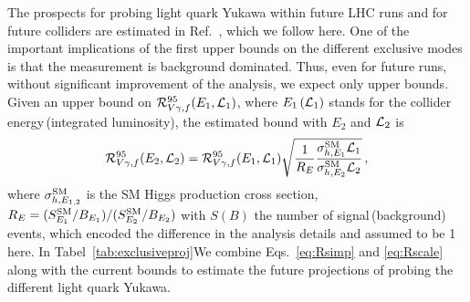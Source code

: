 \documentclass[../report.tex]{subfiles}
\begin{document}
The prospects for probing light quark Yukawa within future LHC runs and for future colliders are estimated in Ref.~\cite{Perez:2015lra}, which we follow here. 
One of the important implications of the first upper bounds on the different exclusive modes is that the measurement is background dominated. Thus, even for future runs, without significant improvement of the analysis, we expect only upper bounds.  
Given an upper bound on $\mathcal{R}^{95}_{V\gamma,f}(E_1,\mathcal{L}_1)$, where $E_1\,(\mathcal{L}_1)$ stands for the collider energy\,(integrated luminosity), the estimated bound with $E_2$ and $\mathcal{L}_2$ is
%
\begin{align}
	\label{eq:Rscale}
	\mathcal{R}^{95}_{V\gamma,f}(E_2,\mathcal{L}_2)
=	\mathcal{R}^{95}_{V\gamma,f}(E_1,\mathcal{L}_1) \sqrt{ \frac{1}{R_E} \frac{\sigma^{\rm SM}_{h,E_1} \mathcal{L}_1  }{\sigma^{\rm SM}_{h,E_2} \mathcal{L}_2} } \, ,
\end{align}
%
where $\sigma^{\rm SM}_{h,E_{1,2}}$ is the SM Higgs production cross section, $R_{E} = (S_{E_1}^{\rm SM}/B_{E_1})/(S_{E_2}^{\rm SM}/B_{E_2})$ with $S(B)$ the number of signal\,(background) events, which encoded the difference in the analysis details and assumed to be 1 here. 
In Tabel~\ref{tab:exclusiveproj}We combine Eqs.~\eqref{eq:Rsimp} and \eqref{eq:Rscale} along with the current bounds to estimate the future projections of probing the different light quark Yukawa. 
\end{document}
